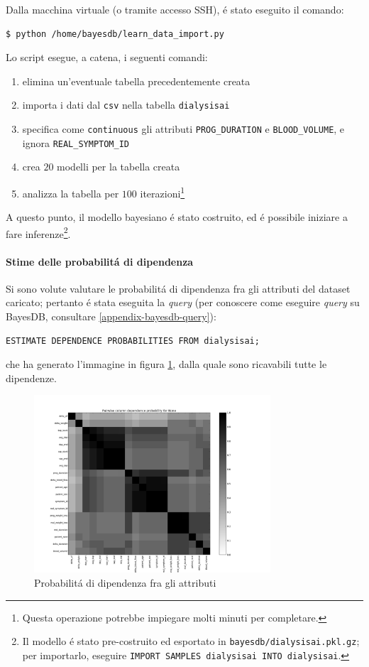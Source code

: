 \documentclass[preprint]{acm_proc_article-sp}
\begin{document}
Dalla macchina virtuale (o tramite accesso SSH), \'e stato eseguito il comando:
\begin{verbatim}
$ python /home/bayesdb/learn_data_import.py
\end{verbatim}

Lo script esegue, a catena, i seguenti comandi:
\begin{enumerate}
\item elimina un'eventuale tabella precedentemente creata
\item importa i dati dal \verb|csv| nella tabella \verb|dialysisai|
\item specifica come \verb|continuous| gli attributi \verb|PROG_DURATION| e \verb|BLOOD_VOLUME|, e ignora \verb|REAL_SYMPTOM_ID|
\item crea $20$ modelli per la tabella creata
\item analizza la tabella per $100$ iterazioni\footnote{Questa operazione potrebbe impiegare molti minuti per completare.}
\end{enumerate}

A questo punto, il modello bayesiano \'e stato costruito, ed \'e possibile iniziare a fare inferenze\footnote{Il modello \'e stato pre-costruito ed esportato in \verb|bayesdb/dialysisai.pkl.gz|; per importarlo, eseguire \verb|IMPORT SAMPLES dialysisai INTO dialysisai|.}.

\paragraph{Stime delle probabilit\'a di dipendenza}
Si sono volute valutare le probabilit\'a di dipendenza fra gli attributi del dataset caricato; pertanto \'e stata eseguita la \textit{query} (per conoscere come eseguire \textit{query} su BayesDB, consultare \ref{appendix-bayesdb-query}):
\begin{verbatim}
ESTIMATE DEPENDENCE PROBABILITIES FROM dialysisai;
\end{verbatim}
che ha generato l'immagine in figura \ref{fig:bayesdb-dep-prob1}, dalla quale sono ricavabili tutte le dipendenze.

\begin{figure}[!htb]
\centering
\includegraphics[width=250pt]{../bayesdb/dialysis_prob_dependencies.png}
\caption{Probabilit\'a di dipendenza fra gli attributi}
\label{fig:bayesdb-dep-prob1}
\end{figure}
\end{document}
